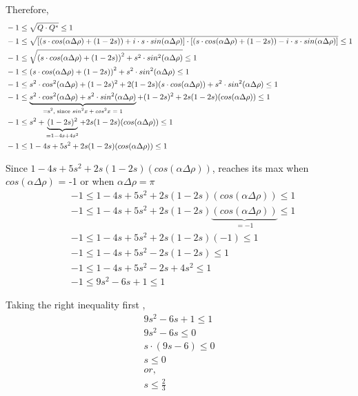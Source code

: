 \documentclass[11pt]{article}
\begin{document}
Therefore, \begin{equation}
\begin{split}
&-1 \leq \sqrt{Q \cdot Q^{*}} \leq 1 \\
&-1 \leq \sqrt{\left[\left( s \cdot cos(\alpha \Delta \rho) + (1-2s) \right)  + i \cdot s \cdot sin(\alpha \Delta \rho)\right] \cdot 
\left[\left( s \cdot cos(\alpha \Delta \rho) + (1-2s) \right)  - i \cdot s \cdot sin(\alpha \Delta \rho)\right]} \leq 1 \\
&-1 \leq \sqrt{\left( s \cdot cos(\alpha \Delta \rho) + (1-2s) \right)^2  + s^2 \cdot sin^2(\alpha \Delta \rho)} \leq 1 \\ 
&-1 \leq \left( s \cdot cos(\alpha \Delta \rho) + (1-2s) \right)^2  + s^2 \cdot sin^2(\alpha \Delta \rho) \leq 1 \\
&-1 \leq s^2 \cdot cos^2(\alpha \Delta \rho) + (1-2s)^2 + 2(1-2s)(s \cdot cos(\alpha \Delta \rho)) + s^2 \cdot sin^2(\alpha \Delta \rho) \leq 1 \\
&-1 \leq \underbrace{s^2 \cdot cos^2(\alpha \Delta \rho) + s^2 \cdot sin^2(\alpha \Delta \rho)}_{\text{=s$^2$, since $ sin^2 x + cos^2x $ = 1}}  + (1-2s)^2 + 2s(1-2s)(cos(\alpha \Delta \rho)) \leq 1 \\
&-1 \leq s^2 + \underbrace{(1-2s)^2}_{=1-4s+4s^2} + 2s(1-2s)(cos(\alpha \Delta \rho)) \leq 1 \\
&-1 \leq 1-4s+5s^2 + 2s(1-2s)(cos(\alpha \Delta \rho)) \leq 1 
\end{split}
\end{equation}

Since \(1-4s+5s^2 + 2s(1-2s)(cos(\alpha \Delta \rho))\), reaches its max
when \(cos(\alpha \Delta \rho)\) = -1 or when
\(\alpha \Delta \rho = \pi\) \begin{equation}
\begin{split}
&-1 \leq 1 - 4s + 5s^2 + 2s(1-2s)(cos(\alpha \Delta \rho)) \leq 1 \\
&-1 \leq 1 - 4s + 5s^2 + 2s(1-2s)\underbrace{(cos(\alpha \Delta \rho))}_{=-1} \leq 1 \\ 
&-1 \leq 1 - 4s + 5s^2 + 2s(1-2s)(-1) \leq 1 \\ 
&-1 \leq 1 - 4s + 5s^2 - 2s(1-2s) \leq 1 \\ 
&-1 \leq 1 - 4s + 5s^2 - 2s + 4s^2 \leq 1 \\ 
&-1 \leq 9s^2 - 6s + 1 \leq 1 
\end{split}
\end{equation}

Taking the right inequality first , \begin{equation}
\begin{split}
9s^2 - 6s + 1 \leq 1  \\
9s^2 - 6s \leq 0  \\
s \cdot (9s - 6) \leq 0  \\
s \leq 0 \\ or, \\
s \leq \frac{2}{3}
\end{split}
\end{equation}
\end{document}
